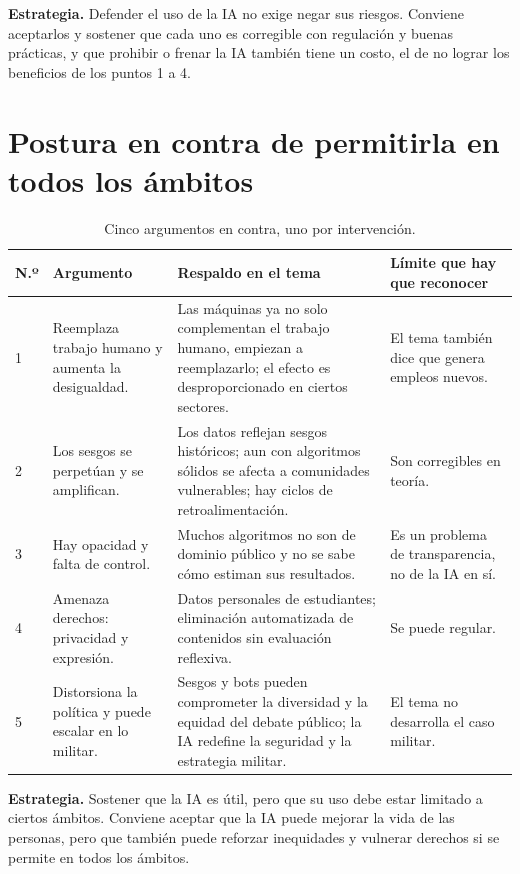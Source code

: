 \documentclass[11pt,letterpaper]{article}
\begin{document}
\textbf{Estrategia.} Defender el uso de la IA no exige negar sus riesgos. Conviene aceptarlos y sostener que cada uno es corregible con regulación y buenas prácticas, y que prohibir o frenar la IA también tiene un costo, el de no lograr los beneficios de los puntos 1 a 4.

\section{Postura en contra de permitirla en todos los ámbitos}

\begin{table}[H]
\centering
\scriptsize
\renewcommand{\arraystretch}{1.25}
\begin{tabularx}{\textwidth}{@{}p{0.6cm}p{3.1cm}Xp{3.6cm}@{}}
\toprule
\textbf{N.º} & \textbf{Argumento} & \textbf{Respaldo en el tema} & \textbf{Límite que hay que reconocer} \\
\midrule
1 & Reemplaza trabajo humano y aumenta la desigualdad. & Las máquinas ya no solo complementan el trabajo humano, empiezan a reemplazarlo; el efecto es desproporcionado en ciertos sectores. & El tema también dice que genera empleos nuevos. \\
2 & Los sesgos se perpetúan y se amplifican. & Los datos reflejan sesgos históricos; aun con algoritmos sólidos se afecta a comunidades vulnerables; hay ciclos de retroalimentación. & Son corregibles en teoría. \\
3 & Hay opacidad y falta de control. & Muchos algoritmos no son de dominio público y no se sabe cómo estiman sus resultados. & Es un problema de transparencia, no de la IA en sí. \\
4 & Amenaza derechos: privacidad y expresión. & Datos personales de estudiantes; eliminación automatizada de contenidos sin evaluación reflexiva. & Se puede regular. \\
5 & Distorsiona la política y puede escalar en lo militar. & Sesgos y bots pueden comprometer la diversidad y la equidad del debate público; la IA redefine la seguridad y la estrategia militar. & El tema no desarrolla el caso militar. \\
\bottomrule
\end{tabularx}
\caption{Cinco argumentos en contra, uno por intervención.}\label{tab:contra}
\end{table}

\textbf{Estrategia.} Sostener que la IA es útil, pero que su uso debe estar limitado a ciertos ámbitos. Conviene aceptar que la IA puede mejorar la vida de las personas, pero que también puede reforzar inequidades y vulnerar derechos si se permite en todos los ámbitos.
\end{document}
